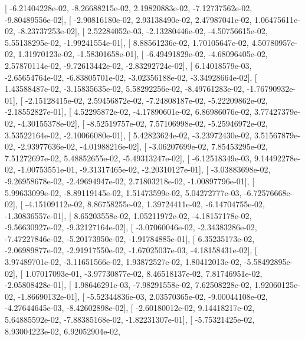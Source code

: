 \documentclass{article}
\begin{document}
       [ -6.21404228e-02,  -8.26688215e-02,   2.19820883e-02,
         -7.12737562e-02,  -9.80489556e-02],
       [ -2.90816180e-02,   2.93138490e-02,   2.47987041e-02,
          1.06475611e-02,  -8.23737253e-02],
       [  2.52284052e-03,  -2.13280446e-02,  -4.50756615e-02,
          5.55138295e-02,  -1.99241554e-01],
       [  8.88561236e-02,   1.70105647e-02,   4.50780957e-02,
          1.31970123e-02,  -1.58301658e-01],
       [ -6.49491829e-02,  -4.68096405e-02,   2.57870114e-02,
         -9.72613442e-02,  -2.83292724e-02],
       [  6.14018579e-03,  -2.65654764e-02,  -6.83805701e-02,
         -3.02356188e-02,  -3.34928664e-02],
       [  1.43588487e-02,  -3.15835635e-02,   5.58292256e-02,
         -8.49761283e-02,  -1.76790932e-01],
       [ -2.15128415e-02,   2.59456872e-02,  -7.24808187e-02,
         -5.22209862e-02,  -2.18552827e-01],
       [  4.52295872e-02,  -4.17890601e-02,   6.86986076e-02,
          3.77427379e-02,  -4.30155378e-02],
       [ -8.52519757e-02,   7.57106998e-02,  -5.25946972e-02,
          3.53522164e-02,  -2.10066080e-01],
       [  5.42823624e-02,  -3.23972430e-02,   3.51567879e-02,
         -2.93977636e-02,  -4.01988216e-02],
       [ -3.06207699e-02,   7.85453295e-02,   7.51272697e-02,
          5.48852655e-02,  -5.49313247e-02],
       [ -6.12518349e-03,   9.14492278e-02,  -1.00753551e-01,
         -9.31317465e-02,  -2.20310127e-01],
       [ -3.03883698e-02,  -9.26958678e-02,  -2.49694947e-02,
          2.71803218e-02,  -1.00897796e-01],
       [  5.99633099e-02,  -8.89119145e-02,   1.51473599e-02,
          5.04272777e-03,  -6.72576668e-02],
       [ -4.15109112e-02,   8.86758255e-02,   1.39724411e-02,
         -6.14704755e-02,  -1.30836557e-01],
       [  8.65203558e-02,   1.05211972e-02,  -4.18157178e-02,
         -9.56630927e-02,  -9.32127164e-02],
       [ -3.07060046e-02,  -2.34383286e-02,  -7.47227846e-02,
         -5.20173950e-02,  -1.91784885e-01],
       [  6.35235173e-02,  -2.06989877e-02,  -2.91917550e-02,
         -1.67025037e-03,  -4.18158431e-02],
       [  3.97489701e-02,  -3.11651566e-02,   1.93872527e-02,
          1.80412013e-02,  -5.58492895e-02],
       [  1.07017093e-01,  -3.97730877e-02,   8.46518137e-02,
          7.81746951e-02,  -2.05808428e-01],
       [  1.98646291e-03,  -7.98291558e-02,   7.62508228e-02,
          1.92060125e-02,  -1.86690132e-01],
       [ -5.52344836e-03,   2.03570365e-02,  -9.00044108e-02,
         -4.27644645e-03,  -8.42602898e-02],
       [ -2.60180012e-02,   9.14418217e-02,   5.64885592e-02,
         -7.88385168e-02,  -1.82231307e-01],
       [ -5.75321425e-02,   8.93004223e-02,   6.92052904e-02,
\end{document}
